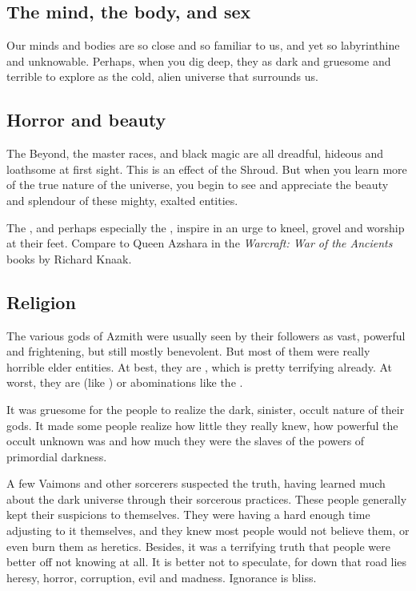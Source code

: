 \subsection{The mind, the body, and sex}
Our minds and bodies are so close and so familiar to us, and yet so labyrinthine and unknowable. 
Perhaps, when you dig deep, they as dark and gruesome and terrible to explore as the cold, alien universe that surrounds us. 







\subsection{Horror and beauty}
The Beyond, the master races, \daemons{} and black magic are all dreadful, hideous and loathsome at first sight. 
This is an effect of the Shroud. 
But when you learn more of the true nature of the universe, you begin to see and appreciate the beauty and splendour of these mighty, exalted entities. 

The \resphain, and perhaps especially the \resviel, inspire in \humans{} an urge to kneel, grovel and worship at their feet. 
Compare to Queen Azshara in the \emph{Warcraft: War of the Ancients} books by Richard Knaak. 









\subsection{Religion}
The various gods of Azmith were usually seen by their followers as vast, powerful and frightening, but still mostly benevolent.
But most of them were really horrible elder entities. 
At best, they are \dragons, which is pretty terrifying already.
At worst, they are \xss (like ) or abominations like the \sephiroth. 

It was gruesome for the people to realize the dark, sinister, occult nature of their gods.
It made some people realize how little they really knew, how powerful the occult unknown was and how much they were the slaves of the powers of primordial darkness.

A few Vaimons and other sorcerers suspected the truth, having learned much about the dark universe through their sorcerous practices.
These people generally kept their suspicions to themselves.
They were having a hard enough time adjusting to it themselves, and they knew most people would not believe them, or even burn them as heretics. 
Besides, it was a terrifying truth that people were better off not knowing at all.
It is better not to speculate, for down that road lies heresy, horror, corruption, evil and madness.
Ignorance is bliss.







